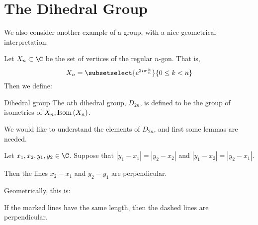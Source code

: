 \documentclass[../Main.tex]{subfiles}
\begin{document}
\section{The Dihedral Group}
We also consider another example of a group, with a nice geometrical interpretation.\par
Let $X_n \subset \C$ be the set of vertices of the regular $n$-gon. That is,
\begin{equation}
    X_n = \subsetselect{e^{2i\pi\frac{k}{n}}}{0\leq k < n}
    \label{eqnXn}
\end{equation}
Then we define:
\begin{definition}{Dihedral group}
    The $n$th dihedral group, $D_{2n}$, is defined to be the group of isometries of $X_n, \operatorname{Isom}{(X_n)}$.
\end{definition}
We would like to understand the elements of $D_{2n}$, and first some lemmas are needed.
\begin{lemma}
    Let $x_1, x_2, y_1, y_2 \in \C$. Suppose that $|y_1 - x_1| = |y_2 - x_2|$ and $|y_1 - x_2| = |y_2 - x_1|$.\par
    Then the lines $x_2 - x_1$ and $y_2 - y_1$ are perpendicular.
\end{lemma}
Geometrically, this is:
\begin{center}
\end{center}
If the marked lines have the same length, then the dashed lines are perpendicular.\par
\end{document}
